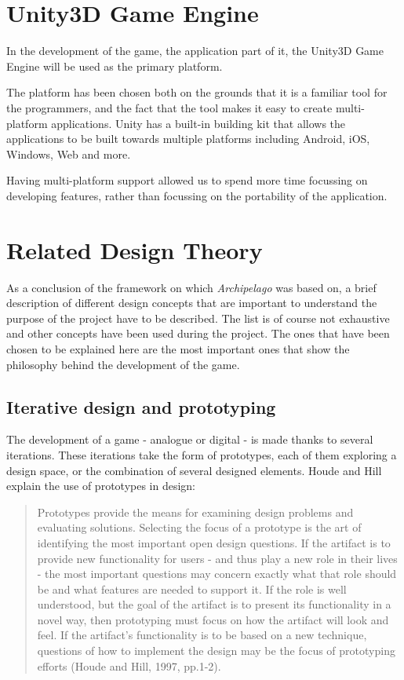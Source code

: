 \section{Unity3D Game Engine}
In the development of the game, the application part of it, the Unity3D Game Engine\cite{engine:unity} will be used as the primary platform.

The platform has been chosen both on the grounds that it is a familiar tool for the programmers, and the fact that the tool makes it easy to create multi-platform applications. Unity has a built-in building kit that allows the applications to be built towards multiple platforms including Android, iOS, Windows, Web and more. 

Having multi-platform support allowed us to spend more time focussing on developing features, rather than focussing on the portability of the application.

\section{Related Design Theory}
As a conclusion of the framework on which \textit{Archipelago} was based on, a brief description of different design concepts that are important to understand the purpose of the project have to be described. The list is of course not exhaustive and other concepts have been used during the project. The ones that have been chosen to be explained here are the most important ones that show the philosophy behind the development of the game. 

\subsection{Iterative design and prototyping}
\label{sec:proto}
The development of a game - analogue or digital - is made thanks to several iterations. These iterations take the form of prototypes, each of them exploring a design space, or the combination of several designed elements. Houde and Hill explain the use of prototypes in design:

\begin{quotation}
Prototypes provide the means for examining design problems and evaluating solutions. Selecting the focus of a prototype is the art of identifying the most important open design questions. If the artifact is to provide new functionality for users - and thus play a new role in their lives - the most important questions may concern exactly what that role should be and what features are needed to support it. If the role is well understood, but the goal of the artifact is to present its functionality in a novel way, then prototyping must focus on how the artifact will look and feel. If the artifact's functionality is to be based on a new technique, questions of how to implement the design may be the focus of prototyping efforts (Houde and Hill, 1997, pp.1-2)\cite{book:proto}.
\end{quotation}

